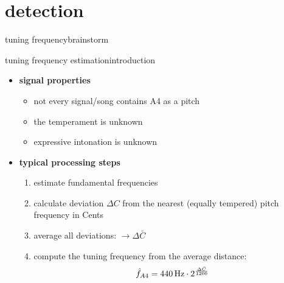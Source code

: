     \section[detection]{detection}
        \begin{frame}{tuning frequency}{brainstorm}
        \end{frame}
	\begin{frame}{tuning frequency estimation}{introduction}
		\begin{itemize}
			\item	\textbf{signal properties}
                \begin{itemize}
                    \item   not every signal/song contains A4 as a pitch
                    \item   the temperament is unknown
                    \item   expressive intonation is unknown
                \end{itemize}
                
            \bigskip
            \item<2->   \textbf{typical processing steps}
                \begin{enumerate}
                    \item<2->   estimate fundamental frequencies
                    
                    \item<3->   calculate deviation  $\Delta C$ from the nearest (equally tempered) pitch frequency in Cents
                    
                    \item<4->   average all deviations:  $\rightarrow \Delta \bar{C}$ 
                    
                    \item<5->   compute the tuning frequency from the average distance:
                        \begin{equation*}
                            \hat{f}_{A4} = \unit[440]{Hz} \cdot 2^\frac{\Delta \bar{C}}{1200}
                        \end{equation*}
                \end{enumerate}
		\end{itemize}
	\end{frame}
